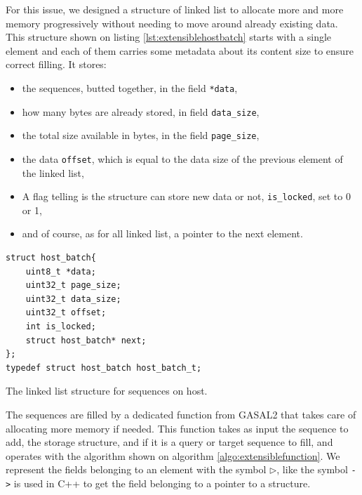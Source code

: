 For this issue, we designed a structure of linked list to allocate more and more memory progressively without needing to move around already existing data. This structure shown on listing \ref{lst:extensiblehostbatch} starts with a single element and each of them carries some metadata about its content size to ensure correct filling. It stores:

\begin{itemize}
	\item the sequences, butted together, in the field \verb|*data|,
	\item how many bytes are already stored, in field \verb|data_size|,
	\item the total size available in bytes, in the field \verb|page_size|,
	\item the data \verb|offset|, which is equal to the data size of the previous element of the linked list,
	\item A flag telling is the structure can store new data or not, \verb|is_locked|, set to 0 or 1,
	\item and of course, as for all linked list, a pointer to the next element.
\end{itemize}

\begin{listing}[h!]
	\begin{verbatim}
struct host_batch{
	uint8_t *data;
	uint32_t page_size;
	uint32_t data_size;
	uint32_t offset;
	int is_locked;
	struct host_batch* next;
};
typedef struct host_batch host_batch_t;
	\end{verbatim}
\caption{The linked list structure for sequences on host.}
\label{lst:extensiblehostbatch}
\end{listing}

The sequences are filled by a dedicated function from GASAL2 that takes care of allocating more memory if needed. This function takes as input the sequence to add, the storage structure, and if it is a query or target sequence to fill, and operates with the algorithm shown on algorithm \ref{algo:extensiblefunction}. We represent the fields belonging to an element with the symbol $\rhd$, like the symbol \verb|->| is used in C++ to get the field belonging to a pointer to a structure.



